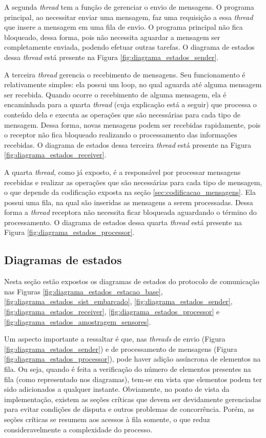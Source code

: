 A segunda \textit{thread} tem a função de gerenciar o envio de mensagens. O programa principal, ao necessitar enviar uma mensagem, faz uma requisição a essa \textit{thread} que insere a mensagem em uma fila de envio. O programa principal não fica bloqueado, dessa forma, pois não necessita aguardar a mensagem ser completamente enviada, podendo efetuar outras tarefas. O diagrama de estados dessa \textit{thread} está presente na Figura \ref{fig:diagrama_estados_sender}.

A terceira \textit{thread} gerencia o recebimento de mensagens. Seu funcionamento é relativamente simples: ela possui um loop, no qual aguarda até alguma mensagem ser recebida. Quando ocorre o recebimento de alguma mensagem, ela é encaminhada para a quarta \textit{thread} (cuja explicação está a seguir) que processa o conteúdo dela e executa as operações que são necessárias para cada tipo de mensagem. Dessa forma, novas mensagens podem ser recebidas rapidamente, pois o receptor não fica bloqueado realizando o processamento das informações recebidas. O diagrama de estados dessa terceira \textit{thread} está presente na Figura \ref{fig:diagrama_estados_receiver}.

A quarta \textit{thread}, como já exposto, é a responsável por processar mensagens recebidas e realizar as operações que são necessárias para cada tipo de mensagem, o que depende da codificação exposta na seção \ref{sec:codificacao_mensagens}. Ela possui uma fila, na qual são inseridas as mensagens a serem processadas. Dessa forma a \textit{thread} receptora não necessita ficar bloqueada aguardando o término do processamento. O diagrama de estados dessa quarta \textit{thread} está presente na Figura \ref{fig:diagrama_estados_processor}.

\subsection{Diagramas de estados}

Nesta seção estão expostos os diagramas de estados do protocolo de comunicação nas Figuras \ref{fig:diagrama_estados_estacao_base}, \ref{fig:diagrama_estados_sist_embarcado}, \ref{fig:diagrama_estados_sender}, \ref{fig:diagrama_estados_receiver}, \ref{fig:diagrama_estados_processor} e \ref{fig:diagrama_estados_amostragem_sensores}.

Um aspecto importante a ressaltar é que, nas \textit{threads} de envio (Figura \ref{fig:diagrama_estados_sender}) e de processamento de mensagens (Figura \ref{fig:diagrama_estados_processor}), pode haver adição assíncrona de elementos na fila. Ou seja, quando é feita a verificação do número de elementos presentes na fila (como representado nos diagramas), tem-se em vista que elementos podem ter sido adicionados a qualquer instante. Obviamente, no ponto de vista da implementação, existem as seções críticas que devem ser devidamente gerenciadas para evitar condições de disputa e outros problemas de concorrência. Porém, as seções críticas se resumem aos acessos à fila somente, o que reduz consideravelmente a complexidade do processo.

